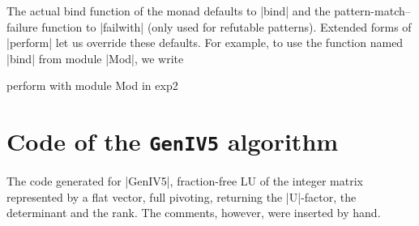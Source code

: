 \documentclass{elsart}
\begin{document}
The actual bind function of the monad defaults to |bind| and the
pattern-match--failure function to |failwith| (only used for refutable
patterns).  Extended forms of |perform| let us override these
defaults. For example, to use the function named 
|bind| from module |Mod|, we write
\begin{code}
        perform with module Mod in exp2
\end{code}

\section{Code of the \texttt{GenIV5} algorithm}
\label{app:code-GenIV5}
The code generated for |GenIV5|, fraction-free LU of the integer matrix
represented by a flat vector, full pivoting, returning the |U|-factor,
the determinant and the rank.  The comments, however, were inserted by
hand.
\end{document}
